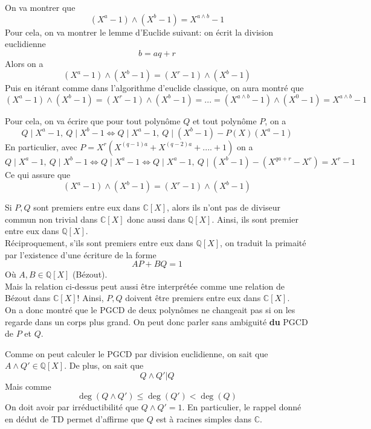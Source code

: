 \begin{sol}
On va montrer que 
$$(X^a-1)\wedge (X^b-1)=X^{a\wedge b}-1 $$
Pour cela, on va montrer le lemme d'Euclide suivant: on écrit la division euclidienne 
$$b=aq+r $$ Alors on a 
$$(X^a-1)\wedge (X^b-1)=(X^r-1)\wedge (X^b-1) $$
Puis en itérant comme dans l'algorithme d'euclide classique, on aura montré que 
$$(X^a-1)\wedge (X^b-1)=(X^r-1)\wedge (X^b-1)=...=(X^{a\wedge b}-1)\wedge (X^0-1)=X^{a\wedge b}-1 $$


Pour cela, on va écrire que pour tout polynôme $Q$ et tout polynôme $P$, on a
$$Q\mid X^a-1, \: Q\mid X^b-1\iff Q\mid X^a-1, \: Q\mid (X^b-1)-P(X)(X^a-1) $$
En particulier, avec $P=X^r(X^{(q-1)a}+X^{(q-2)a}+....+1)$ on a 
$$Q\mid X^a-1, \: Q\mid X^b-1\iff Q\mid X^a-1 \iff Q\mid X^a-1, \: Q\mid (X^b-1)-(X^{qa+r}-X^r)=X^r-1$$
Ce qui assure que 
$$(X^a-1)\wedge (X^b-1)=(X^r-1)\wedge (X^b-1) $$
\end{sol}
\begin{sol}
Si $P,Q$ sont premiers entre eux dans $\mathbb{C}[X]$, alors ils n'ont pas de diviseur commun non trivial dans $\mathbb{C}[X]$ donc aussi dans $\mathbb{Q}[X]$. Ainsi, ils sont premier entre eux dans $\mathbb{Q}[X]$.
\\
Réciproquement, s'ils sont premiers entre eux dans $\mathbb{Q}[X]$, on traduit la primaité par l'existence d'une écriture de la forme
$$AP+BQ=1 $$ Où $A,B\in \mathbb{Q}[X]$ (Bézout).
\\
Mais la relation ci-dessus peut aussi être interprétée comme une relation de Bézout dans $\mathbb{C}[X]$! Ainsi, $P,Q$ doivent être premiers entre eux dans $\mathbb{C}[X]$.
\\
On a donc montré que le PGCD de deux polynômes ne changeait pas si on les regarde dans un corps plus grand. On peut donc parler sans ambiguité \textbf{du} PGCD de $P$ et $Q$.
\end{sol}
\begin{sol}
Comme on peut calculer le PGCD par division euclidienne, on sait que $A\wedge Q'\in \mathbb{Q}[X]$. De plus, on sait que 
$$Q\wedge Q'|Q $$ Mais comme 
$$\deg(Q\wedge Q')\leq \deg(Q')<\deg(Q) $$
On doit avoir par irréductibilité que $Q\wedge Q'=1$. En particulier, le rappel donné en dédut de TD permet d'affirme que $Q$ est à racines simples dans $\mathbb{C}$.
\end{sol}
